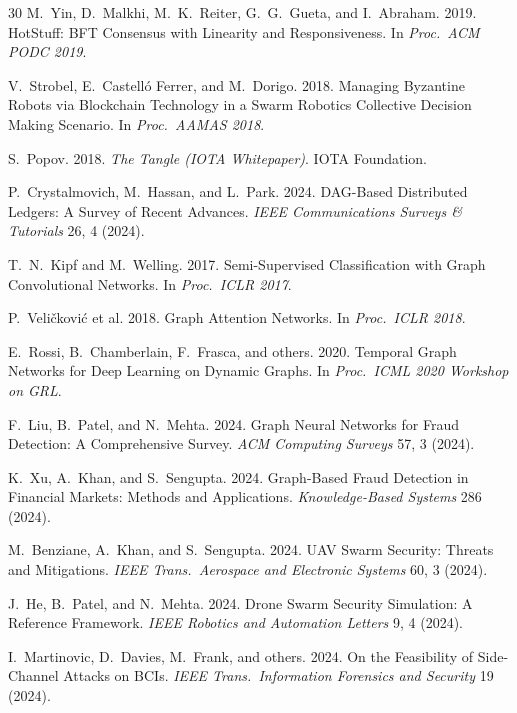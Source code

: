 \documentclass[sigconf,nonacm]{acmart}
\begin{document}
\begin{thebibliography}{30}
M.~Yin, D.~Malkhi, M.~K.~Reiter, G.~G.~Gueta, and I.~Abraham.
2019. HotStuff: BFT Consensus with Linearity and Responsiveness.
In \textit{Proc.\ ACM PODC 2019}.

V.~Strobel, E.~Castell\'o Ferrer, and M.~Dorigo. 2018. Managing
Byzantine Robots via Blockchain Technology in a Swarm Robotics
Collective Decision Making Scenario. In \textit{Proc.\ AAMAS
2018}.

S.~Popov. 2018. \textit{The Tangle (IOTA Whitepaper)}.
IOTA Foundation.

P.~Crystalmovich, M.~Hassan, and L.~Park. 2024. DAG-Based
Distributed Ledgers: A Survey of Recent Advances.
\textit{IEEE Communications Surveys \& Tutorials} 26, 4 (2024).

T.~N.~Kipf and M.~Welling. 2017. Semi-Supervised Classification
with Graph Convolutional Networks. In \textit{Proc.\ ICLR 2017}.

P.~Veli\v{c}kovi\'c et al. 2018. Graph Attention Networks. In
\textit{Proc.\ ICLR 2018}.

E.~Rossi, B.~Chamberlain, F.~Frasca, and others. 2020. Temporal
Graph Networks for Deep Learning on Dynamic Graphs.
In \textit{Proc.\ ICML 2020 Workshop on GRL}.

F.~Liu, B.~Patel, and N.~Mehta. 2024. Graph Neural Networks for
Fraud Detection: A Comprehensive Survey.
\textit{ACM Computing Surveys} 57, 3 (2024).

K.~Xu, A.~Khan, and S.~Sengupta. 2024. Graph-Based Fraud
Detection in Financial Markets: Methods and Applications.
\textit{Knowledge-Based Systems} 286 (2024).

M.~Benziane, A.~Khan, and S.~Sengupta. 2024. UAV Swarm Security:
Threats and Mitigations. \textit{IEEE Trans.\ Aerospace and
Electronic Systems} 60, 3 (2024).

J.~He, B.~Patel, and N.~Mehta. 2024. Drone Swarm Security
Simulation: A Reference Framework.
\textit{IEEE Robotics and Automation Letters} 9, 4 (2024).

I.~Martinovic, D.~Davies, M.~Frank, and others. 2024. On the
Feasibility of Side-Channel Attacks on BCIs.
\textit{IEEE Trans.\ Information Forensics and Security} 19 (2024).


\end{thebibliography}
\end{document}
